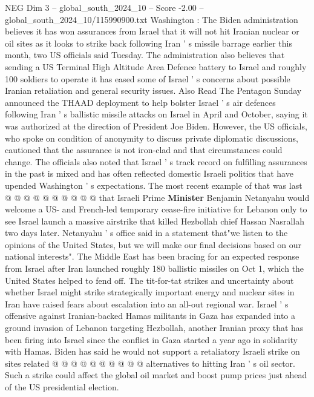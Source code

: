 \begin{textsample}{NEG Dim 3 – global\_south\_2024\_10 – Score -2.00 – global\_south\_2024\_10/115990900.txt}  \label{ex:f3_neg_096}
Washington : The Biden administration believes it has won assurances from Israel that it will not hit Iranian nuclear or oil sites as it looks to strike back following Iran ' s missile barrage earlier this month, two US officials said Tuesday.
The administration also believes that sending a US Terminal High Altitude Area Defence battery to Israel and roughly 100 soldiers to operate it has eased some of Israel ' s concerns about possible Iranian retaliation and general security issues.
Also Read The Pentagon Sunday announced the THAAD deployment to help bolster Israel ' s air defences following Iran ' s ballistic missile attacks on Israel in April and October, saying it was authorized at the direction of President Joe Biden.
However, the US officials, who spoke on condition of anonymity to discuss private diplomatic discussions, cautioned that the assurance is not iron-clad and that circumstances could change.
The officials also noted that Israel ' s track record on fulfilling assurances in the past is mixed and has often reflected domestic Israeli politics that have upended Washington ' s expectations.
The most recent example of that was last @ @ @ @ @ @ @ @ @ @ that Israeli Prime \textbf{Minister} Benjamin Netanyahu would welcome a US- and French-led temporary cease-fire initiative for Lebanon only to see Israel launch a massive airstrike that killed Hezbollah chief Hassan Nasrallah two days later.
Netanyahu ' s office said in a statement that"we listen to the opinions of the United States, but we will make our final decisions based on our national interests".
The Middle East has been bracing for an expected response from Israel after Iran launched roughly 180 ballistic missiles on Oct 1, which the United States helped to fend off.
The tit-for-tat strikes and uncertainty about whether Israel might strike strategically important energy and nuclear sites in Iran have raised fears about escalation into an all-out regional war.
Israel ' s offensive against Iranian-backed Hamas militants in Gaza has expanded into a ground invasion of Lebanon targeting Hezbollah, another Iranian proxy that has been firing into Israel since the conflict in Gaza started a year ago in solidarity with Hamas.
Biden has said he would not support a retaliatory Israeli strike on sites related @ @ @ @ @ @ @ @ @ @ alternatives to hitting Iran ' s oil sector.
Such a strike could affect the global oil market and boost pump prices just ahead of the US presidential election.

\end{textsample}
